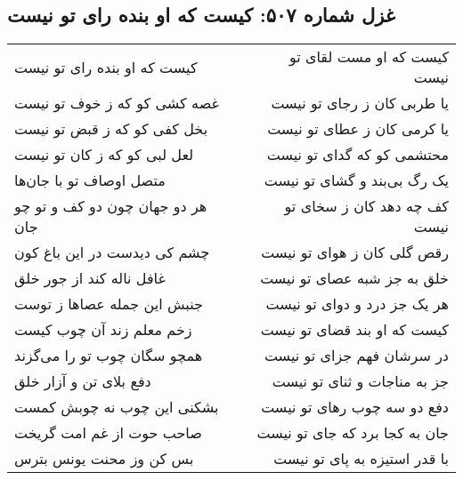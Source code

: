 \begin{center}
\section*{غزل شماره ۵۰۷: کیست که او بنده رای تو نیست}
\label{sec:0507}
\begin{longtable}{l p{0.5cm} r}
کیست که او بنده رای تو نیست
&&
کیست که او مست لقای تو نیست
\\
غصه کشی کو که ز خوف تو نیست
&&
یا طربی کان ز رجای تو نیست
\\
بخل کفی کو که ز قبض تو نیست
&&
یا کرمی کان ز عطای تو نیست
\\
لعل لبی کو که ز کان تو نیست
&&
محتشمی کو که گدای تو نیست
\\
متصل اوصاف تو با جان‌ها
&&
یک رگ بی‌بند و گشای تو نیست
\\
هر دو جهان چون دو کف و تو چو جان
&&
کف چه دهد کان ز سخای تو نیست
\\
چشم کی دیدست در این باغ کون
&&
رقص گلی کان ز هوای تو نیست
\\
غافل ناله کند از جور خلق
&&
خلق به جز شبه عصای تو نیست
\\
جنبش این جمله عصاها ز توست
&&
هر یک جز درد و دوای تو نیست
\\
زخم معلم زند آن چوب کیست
&&
کیست که او بند قضای تو نیست
\\
همچو سگان چوب تو را می‌گزند
&&
در سرشان فهم جزای تو نیست
\\
دفع بلای تن و آزار خلق
&&
جز به مناجات و ثنای تو نیست
\\
بشکنی این چوب نه چوبش کمست
&&
دفع دو سه چوب رهای تو نیست
\\
صاحب حوت از غم امت گریخت
&&
جان به کجا برد که جای تو نیست
\\
بس کن وز محنت یونس بترس
&&
با قدر استیزه به پای تو نیست
\\
\end{longtable}
\end{center}
